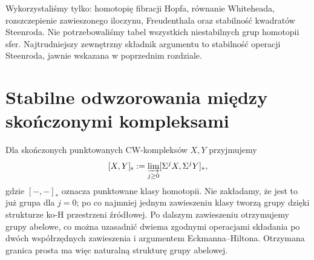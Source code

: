 \begin{uwaga}
Wykorzystaliśmy tylko: homotopię fibracji Hopfa,
równanie Whiteheada, rozszczepienie zawieszonego
iloczynu, Freudenthala oraz stabilność kwadratów
Steenroda. Nie potrzebowaliśmy tabel wszystkich
niestabilnych grup homotopii sfer. Najtrudniejszy
zewnętrzny składnik argumentu to stabilność operacji
Steenroda, jawnie wskazana w poprzednim rozdziale.
\end{uwaga}

\section{Stabilne odwzorowania między skończonymi kompleksami}
\begin{definicja}
Dla skończonych punktowanych CW-kompleksów $X,Y$
przyjmujemy
\[
 [X,Y]_{\mathrm s}:=\varinjlim_{j\ge0}
 [\Sigma^jX,\Sigma^jY]_*,
\]
gdzie $[-,-]_*$ oznacza punktowane klasy homotopii.
Nie zakładamy, że jest to już grupa dla $j=0$;
po co najmniej jednym zawieszeniu klasy tworzą
grupy dzięki strukturze ko-H przestrzeni źródłowej.
Po dalszym zawieszeniu otrzymujemy grupy abelowe,
co można uzasadnić dwiema zgodnymi operacjami
składania po dwóch współrzędnych zawieszenia
i argumentem Eckmanna--Hiltona.
Otrzymana granica prosta ma więc naturalną
strukturę grupy abelowej.
\end{definicja}

